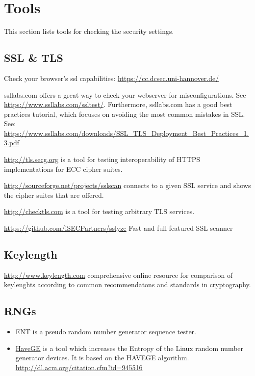 \section{Tools}
\label{section:Tools}
This section lists tools for checking the security settings.

\subsection{SSL \& TLS}

Check your browser's ssl capabilities: \url{https://cc.dcsec.uni-hannover.de/}


ssllabs.com offers a great way to check your webserver for misconfigurations. See \url{https://www.ssllabs.com/ssltest/}.
Furthermore, ssllabs.com has a good best practices tutorial, which focuses on avoiding the most common mistakes in SSL.
See: \url{https://www.ssllabs.com/downloads/SSL_TLS_Deployment_Best_Practices_1.3.pdf}

\url{http://tls.secg.org} is a tool for testing interoperability of HTTPS implementations for ECC cipher suites.

\url{http://sourceforge.net/projects/sslscan} connects to a given SSL
service and shows the cipher suites that are offered.

\url{http://checktls.com} is a tool for testing arbitrary TLS services. 

\url{https://github.com/iSECPartners/sslyze} Fast and full-featured SSL scanner

\subsection{Keylength}

\url{http://www.keylength.com} comprehensive online resource for comparison of keylenghts according to common recommendatons and standards in cryptography.

\subsection{RNGs}

\begin{itemize}
\item \href{http://www.fourmilab.ch/random/}{ENT} is a pseudo random number generator sequence tester.  
\item \href{http://www.issihosts.com/haveged/}{HaveGE} is a tool which increases the Entropy of the Linux random number generator devices. It is based on the HAVEGE algorithm. \url{http://dl.acm.org/citation.cfm?id=945516}
\end{itemize}



